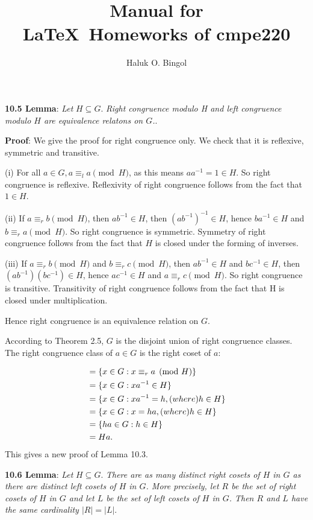 \documentclass[11pt]{amsbook}
\title{
	Manual for\\
	\LaTeX\ Homeworks of cmpe220\\
	{\footnotesize \hbTimeStamp}
}
\author{Haluk O. Bingol}
\date{}                                           %
\begin{document}

\noindent\textbf{10.5 Lemma}: \textit{Let} $H \subseteq G$. \textit{Right congruence modulo H and left congruence modulo $H$ are equivalence relatons on $G$.}.\par

\noindent\textbf{Proof}: We give the proof for right congruence only. We check that it is reflexive, symmetric and transitive. \par
(i) For all $a \in G, a \equiv_l a \pmod{H}$, as this means $aa^{-1} = 1 \in H$. So right congruence is reflexive. Reflexivity of right congruence follows from the fact that $1 \in H$.\par

(ii) If $a \equiv_r b \pmod{H}$, then $ab^{-1} \in H$, then $(ab^{-1})^{-1} \in H$, hence $ba^{-1} \in H$ and $b \equiv_r a \pmod{H}$. So right congruence is symmetric. Symmetry of right congruence follows from the fact that $H$ is closed under the forming of inverses. \par

(iii) If $a \equiv_r b \pmod{H}$ and $b \equiv_r c \pmod{H}$, then $ab^{-1} \in H$ and $bc^{-1} \in H$, then $(ab^{-1})(bc^{-1}) \in H$, hence $ac^{-1} \in H$ and $a \equiv_r c \pmod{H}$. So right congruence is transitive. Transitivity of right congruence follows from the fact that H is closed under multiplication. \par

\noindent Hence right congruence is an equivalence relation on $G$.\par

\noindent According to Theorem 2.5, $G$ is the disjoint union of right congruence classes. The right congruence class of $a \in G$ is the right coset of $a$:

\begin{align*}
[a] &=  \{ x \in G : x \equiv_r a \pmod{H} \} \\
&=  \{ x \in G : xa^{-1} \in H  \} \\
&=  \{ x \in G : xa^{-1} = h, \text(where) h \in H  \} \\
&=  \{ x \in G : x = ha, \text(where) h \in H  \} \\
&=  \{ ha \in G : h \in H  \} \\
&=  Ha.
\end{align*}
This gives a new proof of Lemma 10.3.

\noindent\textbf{10.6 Lemma}: \textit{Let} $H \subseteq G$. \textit{There are as many distinct right cosets of $H$ in $G$ as there are distinct left cosets of $H$ in $G$. More precisely, let $R$ be the set of right cosets of $H$ in $G$ and let $L$ be the set of left cosets of $H$ in $G$. Then $R$ and $L$ have the same cardinality $|R| = |L|$}.
\end{document}
